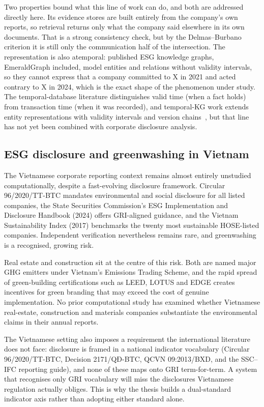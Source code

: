 \documentclass[fontsize=12pt,oneside,headings=small]{scrreprt}
\begin{document}
Two properties bound what this line of work can do, and both are addressed directly here. Its evidence stores are built entirely from the company's own reports, so retrieval returns only what the company said elsewhere in its own documents. That is a strong consistency check, but by the Delmas--Burbano criterion it is still only the communication half of the intersection. The representation is also atemporal: published ESG knowledge graphs, EmeraldGraph included, model entities and relations without validity intervals, so they cannot express that a company committed to X in 2021 and acted contrary to X in 2024, which is the exact shape of the phenomenon under study. The temporal-database literature distinguishes valid time (when a fact holds) from transaction time (when it was recorded), and temporal-KG work extends entity representations with validity intervals and version chains~\cite{hogan2021knowledge}, but that line has not yet been combined with corporate disclosure analysis.

\subsection{ESG disclosure and greenwashing in Vietnam}

The Vietnamese corporate reporting context remains almost entirely unstudied computationally, despite a fast-evolving disclosure framework. Circular 96/2020/TT-BTC mandates environmental and social disclosure for all listed companies, the State Securities Commission's ESG Implementation and Disclosure Handbook (2024) offers GRI-aligned guidance, and the Vietnam Sustainability Index (2017) benchmarks the twenty most sustainable HOSE-listed companies. Independent verification nevertheless remains rare, and greenwashing is a recognised, growing risk.

Real estate and construction sit at the centre of this risk. Both are named major GHG emitters under Vietnam's Emissions Trading Scheme, and the rapid spread of green-building certifications such as LEED, LOTUS and EDGE creates incentives for green branding that may exceed the cost of genuine implementation. No prior computational study has examined whether Vietnamese real-estate, construction and materials companies substantiate the environmental claims in their annual reports.

The Vietnamese setting also imposes a requirement the international literature does not face: disclosure is framed in a national indicator vocabulary (Circular 96/2020/TT-BTC, Decision 2171/QĐ-BTC, QCVN 09:2013/BXD, and the SSC--IFC reporting guide), and none of these maps onto GRI term-for-term. A system that recognises only GRI vocabulary will miss the disclosures Vietnamese regulation actually obliges. This is why the thesis builds a dual-standard indicator axis rather than adopting either standard alone.
\end{document}
